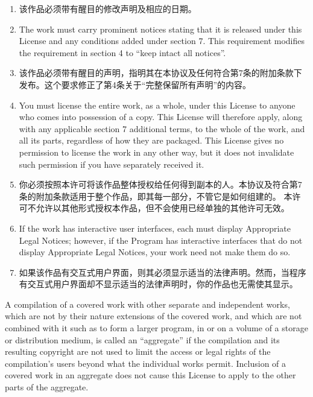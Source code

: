 \documentclass[11pt]{article}
\begin{document}
\begin{enumerate}
\begin{enumerate}
          \item 该作品必须带有醒目的修改声明及相应的日期。

          \item The work must carry prominent notices stating that it is
                released under this License and any conditions added under section
                7.  This requirement modifies the requirement in section 4 to
                ``keep intact all notices''.

          \item 该作品必须带有醒目的声明，指明其在本协议及任何符合第7条的附加条款下发布。这个要求修正了第4条关于“完整保留所有声明”的内容。

          \item You must license the entire work, as a whole, under this
                License to anyone who comes into possession of a copy.  This
                License will therefore apply, along with any applicable section 7
                additional terms, to the whole of the work, and all its parts,
                regardless of how they are packaged.  This License gives no
                permission to license the work in any other way, but it does not
                invalidate such permission if you have separately received it.

          \item 你必须按照本许可将该作品整体授权给任何得到副本的人。本协议及符合第7条的附加条款适用于整个作品，即其每一部分，不管它是如何组建的。
                本许可不允许以其他形式授权本作品，但不会使用已经单独的其他许可无效。

          \item If the work has interactive user interfaces, each must display
                Appropriate Legal Notices; however, if the Program has interactive
                interfaces that do not display Appropriate Legal Notices, your
                work need not make them do so.

          \item 如果该作品有交互式用户界面，则其必须显示适当的法律声明。然而，当程序有交互式用户界面却不显示适当的法律声明时，你的作品也无需使其显示。

        \end{enumerate}
        A compilation of a covered work with other separate and independent
        works, which are not by their nature extensions of the covered work,
        and which are not combined with it such as to form a larger program,
        in or on a volume of a storage or distribution medium, is called an
        ``aggregate'' if the compilation and its resulting copyright are not
        used to limit the access or legal rights of the compilation's users
        beyond what the individual works permit.  Inclusion of a covered work
        in an aggregate does not cause this License to apply to the other
        parts of the aggregate.


\end{enumerate}
\end{document}
